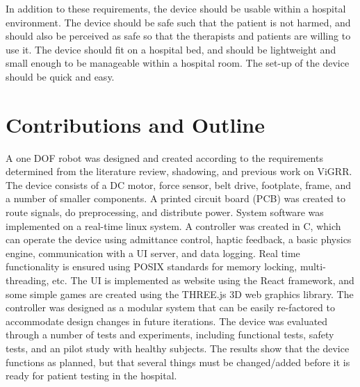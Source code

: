 \documentclass[12pt]{report}
\begin{document}
In addition to these requirements, the device should be usable within a hospital environment. The device should be safe such that the patient is not harmed, and should also be perceived as safe so that the therapists and patients are willing to use it. The device should fit on a hospital bed, and should be lightweight and small enough to be manageable within a hospital room. The set-up of the device should be quick and easy.








\section{Contributions and Outline}

A one DOF robot was designed and created according to the requirements determined from the literature review, shadowing, and previous work on ViGRR. The device consists of a DC motor, force sensor, belt drive, footplate, frame, and a number of smaller components. A printed circuit board (PCB) was created to route signals, do preprocessing, and distribute power. System software was implemented on a real-time linux system. A controller was created in C, which can operate the device using admittance control, haptic feedback, a basic physics engine, communication with a UI server, and data logging. Real time functionality is ensured using POSIX standards for memory locking, multi-threading, etc. The UI is implemented as website using the React framework, and some simple games are created using the THREE.js 3D web graphics library. The controller was designed as a modular system that can be easily re-factored to accommodate design changes in future iterations. The device was evaluated through a number of tests and experiments, including functional tests, safety tests, and an pilot study with healthy subjects. The results show that the device functions as planned, but that several things must be changed/added before it is ready for patient testing in the hospital.
\end{document}
